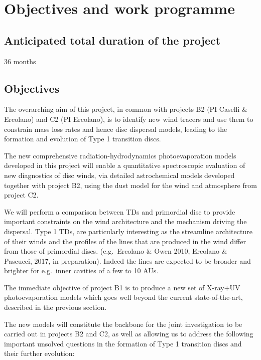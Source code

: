 \documentclass[10pt,fleqn,twoside]{article}
\begin{document}
\section{Objectives and work programme}
\renewcommand{\leftmark}{\sc Objectives and work programme}


\subsection{Anticipated total duration of the project}

36 months

\subsection{Objectives}


The overarching aim of this project, in common with projects B2 (PI
Caselli \& Ercolano) and C2 (PI Ercolano),
is to identify new wind tracers and use them to constrain mass loss rates and hence
disc dispersal models, leading to the formation and evolution of Type 1
transition discs. 

The new comprehensive radiation-hydrodynamics photoevaporation models
developed in this project will enable a quantitative
spectroscopic evaluation of new diagnostics of disc winds, via
detailed astrochemical models developed together with project B2,
using the dust model for the wind and atmosphere from project C2. 

We will perform a comparison between TDs and
primordial disc to provide important constraints on the wind
architecture and the mechanism driving the dispersal. 
Type 1 TDs, are particularly interesting as the streamline architecture of their winds
and the profiles of the lines that are produced in the wind
differ from those of primordial discs. (e.g.\ Ercolano \& Owen
2010, Ercolano \& Pascucci, 2017, in preparation). Indeed the lines
are expected to be broader and brighter for e.g.\ inner cavities of a few to 10 AUs.  

The immediate objective of project B1 is to produce a new set of
X-ray+UV photoevaporation models which goes well beyond the current
state-of-the-art, described in the previous section. 

The new models will constitute the backbone for the joint
investigation to be carried out in projects B2 and C2, as well as
allowing us to address the following important unsolved questions in
the formation of Type 1 transition discs and their further evolution: 
\end{document}
